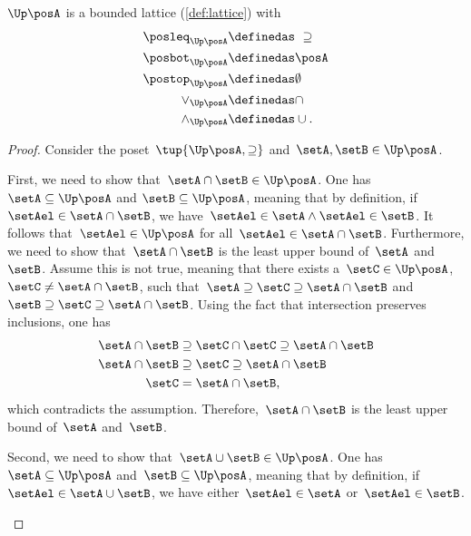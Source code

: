 \begin{definition}[Lattice]
\begin{lemma}
  \label{lem:u_bounded_lat}
  $\Up \posA$ is a bounded lattice (\cref{def:lattice}) with
  \begin{equation}
    \begin{aligned}
      \posleq_{\Up \posA}&\definedas \ \supseteq\\
      \posbot_{\Up \posA}&\definedas \posA\\
      \postop_{\Up \posA}&\definedas \emptyset\\
      \vee_{\Up \posA}&\definedas \cap\\
      \wedge_{\Up \posA}&\definedas \cup.
    \end{aligned}
\end{equation}
\end{lemma}
\begin{proof}
  Consider the poset~$\tup{\Up \posA,\supseteq}$ and~$\setA,\setB\in \Up \posA$.
  \begin{compactitem}
    \item First, we need to show that~$\setA\cap \setB\in \Up \posA$.
    One has~$\setA \subseteq \Up \posA$ and $\setB\subseteq \Up \posA$, meaning that by definition, if~$\setAel\in \setA\cap \setB$, we have~$\setAel \in \setA \wedge \setAel \in \setB$.
    It follows that~$\setAel \in \Up \posA$ for all~$\setAel \in \setA\cap \setB$.
    Furthermore, we need to show that~$\setA\cap \setB$ is the least upper bound of~$\setA$ and~$\setB$.
    Assume this is not true, meaning that  there exists a~$\setC\in \Up \posA$,~$\setC\neq \setA\cap \setB$, such that~$\setA\supseteq \setC\supseteq \setA\cap \setB$ and~$\setB\supseteq \setC\supseteq \setA\cap \setB$.
    Using the fact that intersection preserves inclusions, one has
    \begin{equation}
      \begin{aligned}
        \setA\cap \setB &\supseteq \setC\cap \setC \supseteq \setA\cap \setB\\
        \setA\cap \setB &\supseteq \setC \supseteq \setA\cap \setB\\
        \setC&= \setA\cap \setB,
      \end{aligned}
    \end{equation}
    which contradicts the assumption. Therefore,~$\setA\cap \setB$ is the least upper bound of~$\setA$ and~$\setB$.
    \item Second, we need to show that~$\setA\cup \setB\in \Up \posA$.
    One has~$\setA\subseteq \Up \posA$ and~$\setB\subseteq \Up \posA$, meaning that by definition, if~$\setAel\in \setA\cup \setB$, we have either~$\setAel\in \setA$ or~$\setAel\in \setB$.

\end{compactitem}
\end{proof}
\end{definition}
